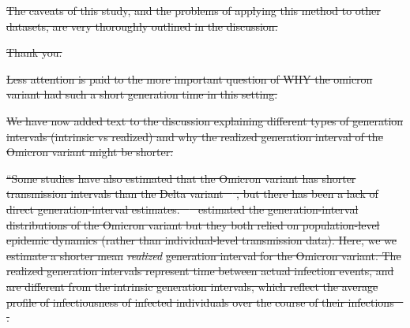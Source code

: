 \documentclass[12pt]{article}
\newcommand{\revtext}{\textsf}
\providecommand{\DIFdeltex}[1]{{\protect\color{red}\sout{#1}}}                      %
\providecommand{\DIFdel}[1]{\texorpdfstring{\DIFdeltex{#1}}{}} %
\begin{document}
\DIFdel{\revtext{The caveats of this study, and the problems of applying this method to other datasets, are very thoroughly outlined in the discussion.} 
}%

\DIFdel{Thank you. }%

\DIFdel{\revtext{Less attention is paid to the more important question of WHY the omicron variant had such a short generation time in this setting.}
}%

\DIFdel{We have now added text to the discussion explaining different types of generation intervals (intrinsic vs realized) and why the realized generation interval of the Omicron variant might be shorter:
}%

\DIFdel{``Some studies have also estimated that the Omicron variant has shorter transmission intervals than the Delta variant \mbox{%
\citep{abbott2022test,kremer2022observed,song2022serial}}\hspace{0pt}%
, but there has been a lack of direct generation-interval estimates.
\mbox{%
\cite{ito2022estimating,selby2022generation} }\hspace{0pt}%
estimated the generation-interval distributions of the Omicron variant but they both relied on population-level epidemic dynamics (rather than individual-level transmission data).
Here, we we estimate a shorter mean }\emph{\DIFdel{realized}} %
\DIFdel{generation interval for the Omicron variant.
The realized generation intervals represent time between actual infection events, and are different from the intrinsic generation intervals, which reflect the average profile of infectiousness of infected individuals over the course of their infections \mbox{%
\citep{champredon2015intrinsic}}\hspace{0pt}%
.
}%
\end{document}

